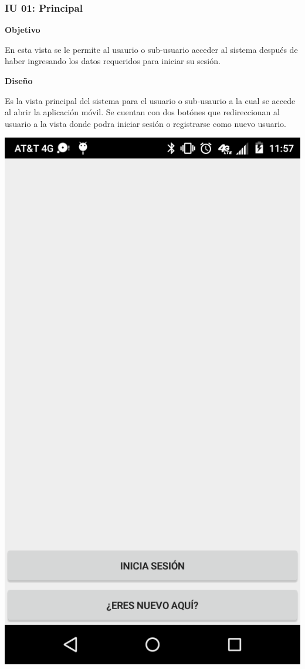 \subsubsection{IU 01: Principal} \label{iu01}
  \textbf{Objetivo} \par
  En esta vista se le permite al usaurio o sub-usuario acceder al sistema después de haber ingresando los datos requeridos para iniciar su sesión. \par
  \textbf{Diseño} \par
  Es la vista principal del sistema para el usuario o sub-usaurio a la cual se accede al abrir la aplicación móvil. Se cuentan con dos botónes que redireccionan al usuario a la vista donde podra iniciar sesión o registrarse como nuevo usuario.
    \begin{center}
      \includegraphics[scale=.2]{Capitulo3/img/gui/IU_Principal.png}
      \label{fig:iu01_fig}
    \end{center}
